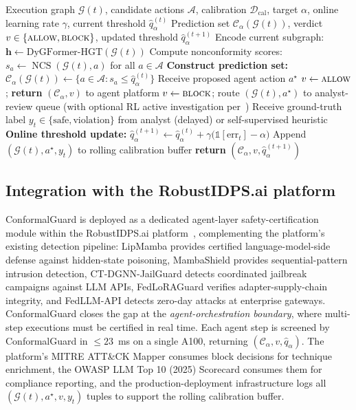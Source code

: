 \documentclass[12pt,a4paper]{article}
\theoremstyle{definition}
\theoremstyle{remark}
\newcommand{\modelname}{ConformalGuard}
\newcommand{\Dcal}{\mathcal{D}}
\newcommand{\Acal}{\mathcal{A}}
\newcommand{\Ccal}{\mathcal{C}}
\newcommand{\Gcal}{\mathcal{G}}
\DeclareMathOperator{\NCS}{NCS}
\begin{document}
\begin{algorithm}[!t]
\small
\caption{\modelname{} Per-Step Safety Certification}
\label{alg:conformalguard}
\begin{algorithmic}[1]
\REQUIRE Execution graph $\Gcal(t)$, candidate actions $\Acal$, calibration $\Dcal_{\mathrm{cal}}$, target $\alpha$, online learning rate $\gamma$, current threshold $\hat{q}_\alpha^{(t)}$
\ENSURE Prediction set $\Ccal_\alpha(\Gcal(t))$, verdict $v \in \{\textsc{allow}, \textsc{block}\}$, updated threshold $\hat{q}_\alpha^{(t+1)}$
\STATE Encode current subgraph: $\mathbf{h} \gets \mathrm{DyGFormer\text{-}HGT}(\Gcal(t))$
\STATE Compute nonconformity scores: $s_a \gets \NCS(\Gcal(t), a)$ for all $a \in \Acal$
\STATE \textbf{Construct prediction set:} $\Ccal_\alpha(\Gcal(t)) \gets \{a \in \Acal : s_a \leq \hat{q}_\alpha^{(t)}\}$
\STATE Receive proposed agent action $a^{\star}$
\IF{$a^{\star} \in \Ccal_\alpha(\Gcal(t))$}
    \STATE $v \gets \textsc{allow}$; \textbf{return} $(\Ccal_\alpha, v)$ to agent platform
\ELSE
    \STATE $v \gets \textsc{block}$; route $(\Gcal(t), a^{\star})$ to analyst-review queue (with optional RL active investigation per~\cite{anaedevha2025dqn})
\ENDIF
\STATE Receive ground-truth label $y_t \in \{\text{safe}, \text{violation}\}$ from analyst (delayed) or self-supervised heuristic
\STATE \textbf{Online threshold update:} $\hat{q}_\alpha^{(t+1)} \gets \hat{q}_\alpha^{(t)} + \gamma\bigl(\mathbb{1}[\text{err}_t] - \alpha\bigr)$
\quad {}
\STATE Append $(\Gcal(t), a^{\star}, y_t)$ to rolling calibration buffer
\STATE \textbf{return} $(\Ccal_\alpha, v, \hat{q}_\alpha^{(t+1)})$
\end{algorithmic}
\end{algorithm}

\subsection{Integration with the RobustIDPS.ai platform}
\label{subsec:platform}

\modelname{} is deployed as a dedicated agent-layer safety-certification module within the RobustIDPS.ai platform~\cite{anaedevha2026robustidps}, complementing the platform's existing detection pipeline: LipMamba provides certified language-model-side defense against hidden-state poisoning, MambaShield provides sequential-pattern intrusion detection, CT-DGNN-JailGuard detects coordinated jailbreak campaigns against LLM APIs, FedLoRAGuard verifies adapter-supply-chain integrity, and FedLLM-API detects zero-day attacks at enterprise gateways. \modelname{} closes the gap at the \emph{agent-orchestration boundary}, where multi-step executions must be certified in real time. Each agent step is screened by \modelname{} in $\le 23$~ms on a single A100, returning $(\Ccal_\alpha, v, \hat{q}_\alpha)$. The platform's MITRE ATT\&CK Mapper consumes block decisions for technique enrichment, the OWASP LLM Top 10 (2025) Scorecard consumes them for compliance reporting, and the production-deployment infrastructure logs all $(\Gcal(t), a^{\star}, v, y_t)$ tuples to support the rolling calibration buffer.
\end{document}
